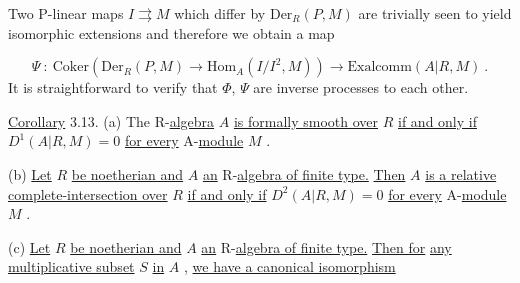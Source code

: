 \begin{center}
\end{center}
Two P-linear maps  $I \rightrightarrows M$  which differ by  $\mathrm{Der}_R(P, M)$  are trivially seen to yield isomorphic extensions and therefore we obtain a map

\begin{equation*}
\Psi \ : \ \mathrm{Coker}(\mathrm{Der}_R(P, M) \to \mathrm{Hom}_A(I/I^2, M)) \to \mathrm{Exalcomm}(A|R, M)  \ .
\end{equation*}
It is straightforward to verify that  $\Phi$, $\Psi$  are inverse processes to each other.

\underline{Corollary} 3.13.  (a)  The R-\underline{algebra}  $A$  \underline{is formally smooth over}  $R$  \underline{if and only if} $D^1(A|R, M) = 0$  \underline{for every} A-\underline{module}  $M$  .

(b)  \underline{Let}  $R$  \underline{be noetherian and}  $A$  \underline{an} R-\underline{algebra of finite type.} \underline{Then}  $A$ \underline{is a relative complete-intersection over}  $R$  \underline{if and only if}  $D^2(A|R, M) = 0$  \underline{for every} A-\underline{module}  $M$  .

(c)  \underline{Let}  $R$  \underline{be noetherian and}  $A$  \underline{an} R-\underline{algebra of finite type.} \underline{Then for} \underline{any multiplicative subset}  $S$  \underline{in}  $A$  , \underline{we have a canonical isomorphism}

